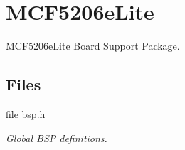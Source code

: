 \hypertarget{group__RTEMSBSPsM68kMCF5206Elite}{}\section{M\+C\+F5206e\+Lite}
\label{group__RTEMSBSPsM68kMCF5206Elite}


M\+C\+F5206e\+Lite Board Support Package.  


\subsection*{Files}
\begin{DoxyCompactItemize}
\item 
file \mbox{\hyperlink{bsps_2m68k_2mcf5206elite_2include_2bsp_8h}{bsp.\+h}}
\begin{DoxyCompactList}\small\item\em Global B\+SP definitions. \end{DoxyCompactList}\end{DoxyCompactItemize}
